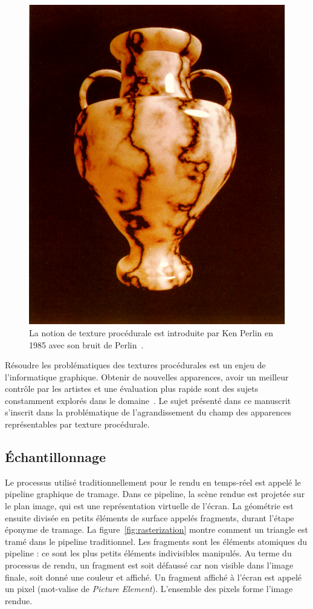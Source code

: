 \begin{figure}[t]
    \centering
    \includegraphics[width=.5\textwidth]{contenu/resources/images/perlin-noise}
    \caption[Bruit de Perlin]{La notion de texture procédurale est introduite par Ken Perlin en 1985 avec son bruit de Perlin~\cite{perlin_image_1985}.}
    \label{fig:perlin-noise}
\end{figure}

Résoudre les problématiques des textures procédurales est un enjeu de l'informatique graphique. Obtenir de nouvelles apparences, avoir un meilleur contrôle par les artistes et une évaluation plus rapide sont des sujets constamment explorés dans le domaine~\cite{baldi_differentiable_2023, heitz_high-performance_2018, lutz_cyclostationary-gaussian_2021, tricard_procedural_2019}. Le sujet présenté dans ce manuscrit s'inscrit dans la problématique de l'agrandissement du champ des apparences représentables par texture procédurale.

\subsection{Échantillonnage}

Le processus utilisé traditionnellement pour le rendu en temps-réel est appelé le pipeline graphique de tramage. Dans ce pipeline, la scène rendue est projetée sur le plan image, qui est une représentation virtuelle de l'écran. La géométrie est ensuite divisée en petits éléments de surface appelés fragments, durant l'étape éponyme de tramage. La figure~\ref{fig:rasterization} montre comment un triangle est tramé dans le pipeline traditionnel. Les fragments sont les éléments atomiques du pipeline : ce sont les plus petits éléments indivisibles manipulés. Au terme du processus de rendu, un fragment est soit défaussé car non visible dans l'image finale, soit donné une couleur et affiché. Un fragment affiché à l'écran est appelé un pixel (mot-valise de \textit{Picture Element}). L'ensemble des pixels forme l'image rendue.

